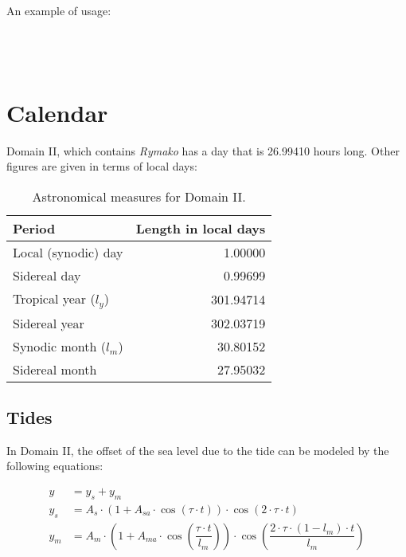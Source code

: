\documentclass{book}
\begin{document}
An example of usage: \\
~\\
 \\
      \\
    

\chapter{Calendar}

Domain II, which contains \emph{Rymako} has a day that is 26.99410 hours long. Other figures are given in terms of local days:

\begin{table}[ht]
    \caption{Astronomical measures for Domain II.}
    \centering
    \begin{tabular}{|l|r|}
        \hline
        Period & Length in local days \\
        \hline
        Local (synodic) day & 1.00000 \\
        Sidereal day & 0.99699 \\
        Tropical year ($l_y$) & 301.94714 \\
        Sidereal year & 302.03719 \\
        Synodic month ($l_m$) & 30.80152 \\
        Sidereal month & 27.95032 \\
        \hline
    \end{tabular}
\end{table}

\section{Tides}

In Domain II, the offset of the sea level due to the tide can be modeled by the following equations:

\begin{align}
    y &= y_s + y_m \\
    y_s &= A_s \cdot \left(1 + A_{sa} \cdot \cos(\tau \cdot t)\right) \cdot \cos(2 \cdot \tau \cdot t) \\
    y_m &= A_m \cdot \left(1 + A_{ma} \cdot \cos\left(\dfrac{\tau \cdot t}{l_m}\right)\right) \cdot \cos\left(\dfrac{2 \cdot \tau \cdot (1 - l_m) \cdot t}{l_m}\right)
\end{align}
\end{document}
